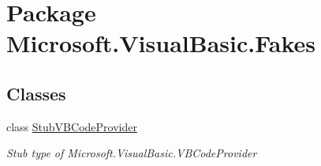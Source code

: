 \hypertarget{namespace_microsoft_1_1_visual_basic_1_1_fakes}{\section{Package Microsoft.\-Visual\-Basic.\-Fakes}
\label{namespace_microsoft_1_1_visual_basic_1_1_fakes}
}
\subsection*{Classes}
\begin{DoxyCompactItemize}
\item 
class \hyperlink{class_microsoft_1_1_visual_basic_1_1_fakes_1_1_stub_v_b_code_provider}{Stub\-V\-B\-Code\-Provider}
\begin{DoxyCompactList}\small\item\em Stub type of Microsoft.\-Visual\-Basic.\-V\-B\-Code\-Provider\end{DoxyCompactList}\end{DoxyCompactItemize}
